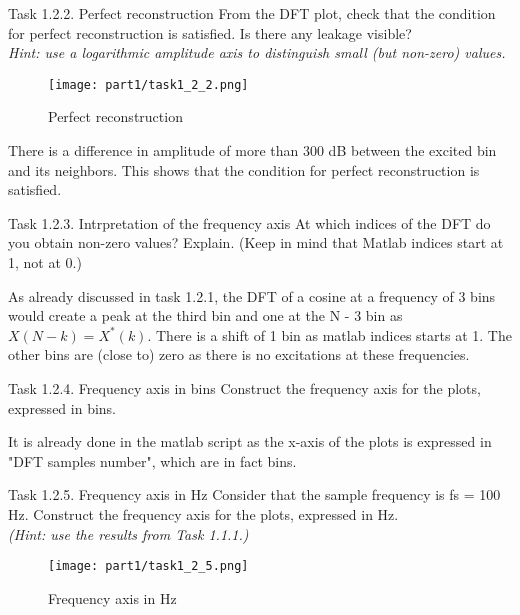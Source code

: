 \begin{Task}{Task 1.2.2. Perfect reconstruction}
    From the DFT plot, check that the condition for perfect reconstruction is satisfied. Is there any leakage visible?\\
    \textit{Hint: use a logarithmic amplitude axis to distinguish small (but non-zero) values.}
\end{Task}

\begin{figure}[H]
    \centering
    \texttt{[image: part1/task1\_2\_2.png]}
    \caption{Perfect reconstruction}
\end{figure}

There is a difference in amplitude of more than 300 dB between the excited bin and its neighbors. This shows that the condition for perfect reconstruction is satisfied.

\begin{Task}{Task 1.2.3. Intrpretation of the frequency axis}
    At which indices of the DFT do you obtain non-zero values? Explain. (Keep in mind that Matlab indices start at 1, not at 0.)
\end{Task}

As already discussed in task 1.2.1, the DFT of a cosine at a frequency of 3 bins would create a peak at the third bin and one at the N - 3 bin as $X(N-k) = X^*(k)$. There is a shift of 1 bin as matlab indices starts at 1. The other bins are (close to) zero as there is no excitations at these frequencies.

\begin{Task}{Task 1.2.4. Frequency axis in bins}
    Construct the frequency axis for the plots, expressed in bins.
\end{Task}

It is already done in the matlab script as the x-axis of the plots is expressed in "DFT samples number", which are in fact bins.

\begin{Task}{Task 1.2.5. Frequency axis in Hz}
    Consider that the sample frequency is fs = 100 Hz. Construct the frequency axis for the plots, expressed in Hz.\\
    \textit{(Hint: use the results from Task 1.1.1.)}
\end{Task}

\begin{figure}[H]
    \centering
    \texttt{[image: part1/task1\_2\_5.png]}
    \caption{Frequency axis in Hz}
\end{figure}

